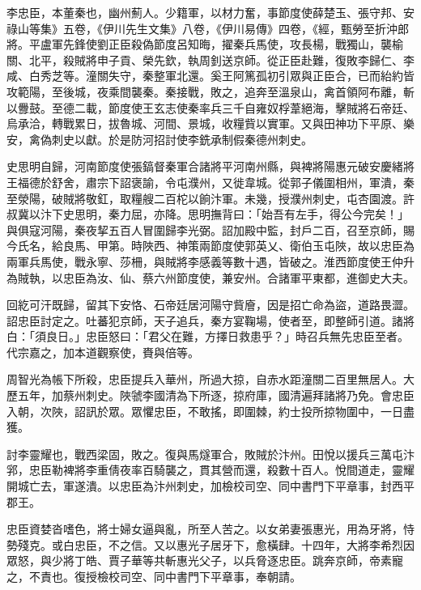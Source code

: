 
\begin{pinyinscope}

 李忠臣，本董秦也，幽州薊人。少籍軍，以材力奮，事節度使薛楚玉、張守邦、安祿山等集》五卷，《伊川先生文集》八卷，《伊川易傳》四卷，《經，甄勞至折沖郎將。平盧軍先鋒使劉正臣殺偽節度呂知晦，擢秦兵馬使，攻長楊，戰獨山，襲榆關、北平，殺賊將申子貢、榮先欽，執周釗送京師。從正臣赴難，復敗李歸仁、李咸、白秀芝等。潼關失守，秦整軍北還。奚王阿篤孤初引眾與正臣合，已而紿約皆攻範陽，至後城，夜乘間襲秦。秦接戰，敗之，追奔至溫泉山，禽首領阿布離，斬以釁鼓。至德二載，節度使王玄志使秦率兵三千自雍奴桴葦絕海，擊賊將石帝廷、烏承洽，轉戰累日，拔魯城、河間、景城，收糧貲以實軍。又與田神功下平原、樂安，禽偽刺史以獻。於是防河招討使李銑承制假秦德州刺史。



 史思明自歸，河南節度使張鎬督秦軍合諸將平河南州縣，與裨將陽惠元破安慶緒將王福德於舒舍，肅宗下詔褒諭，令屯濮州，又徙韋城。從郭子儀圍相州，軍潰，秦至滎陽，破賊將敬釭，取糧艘二百柁以餉汴軍。未幾，授濮州刺史，屯杏園渡。許叔冀以汴下史思明，秦力屈，亦降。思明撫背曰：「始吾有左手，得公今完矣！」與俱寇河陽，秦夜挈五百人冒圍歸李光弼。詔加殿中監，封戶二百，召至京師，賜今氏名，給良馬、甲第。時陜西、神策兩節度使郭英乂、衛伯玉屯陜，故以忠臣為兩軍兵馬使，戰永寧、莎柵，與賊將李感義等數十遇，皆破之。淮西節度使王仲升為賊執，以忠臣為汝、仙、蔡六州節度使，兼安州。合諸軍平東都，進御史大夫。



 回紇可汗既歸，留其下安恪、石帝廷居河陽守貲廥，因是招亡命為盜，道路畏澀。詔忠臣討定之。吐蕃犯京師，天子追兵，秦方宴鞠場，使者至，即整師引道。諸將白：「須良日。」忠臣怒曰：「君父在難，方擇日救患乎？」時召兵無先忠臣至者。代宗嘉之，加本道觀察使，賚與倍等。



 周智光為帳下所殺，忠臣提兵入華州，所過大掠，自赤水距潼關二百里無居人。大歷五年，加蔡州刺史。陜虢李國清為下所逐，掠府庫，國清遍拜諸將乃免。會忠臣入朝，次陜，詔訊於眾。眾懼忠臣，不敢搖，即圍棘，約士投所掠物圍中，一日盡獲。



 討李靈耀也，戰西梁固，敗之。復與馬燧軍合，敗賊於汴州。田悅以援兵三萬屯汴郛，忠臣勒裨將李重倩夜率百騎襲之，貫其營而還，殺數十百人。悅間道走，靈耀開城亡去，軍遂潰。以忠臣為汴州刺史，加檢校司空、同中書門下平章事，封西平郡王。



 忠臣資婪沓嗜色，將士婦女逼與亂，所至人苦之。以女弟妻張惠光，用為牙將，恃勢殘克。或白忠臣，不之信。又以惠光子居牙下，愈橫肆。十四年，大將李希烈因眾怒，與少將丁皓、賈子華等共斬惠光父子，以兵脅逐忠臣。跳奔京師，帝素寵之，不責也。復授檢校司空、同中書門下平章事，奉朝請。




\end{pinyinscope}
